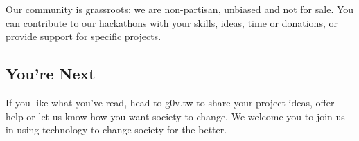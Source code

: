Our community is grassroots: we are non-partisan, unbiased and not for sale. You can contribute to our hackathons with your skills, ideas, time or donations, or provide support for specific projects.

\subsection{You’re Next}

If you like what you’ve read, head to g0v.tw to share your project ideas, offer help or let us know how you want society to change. We welcome you to join us in using technology to change society for the better.




\EndChapter
